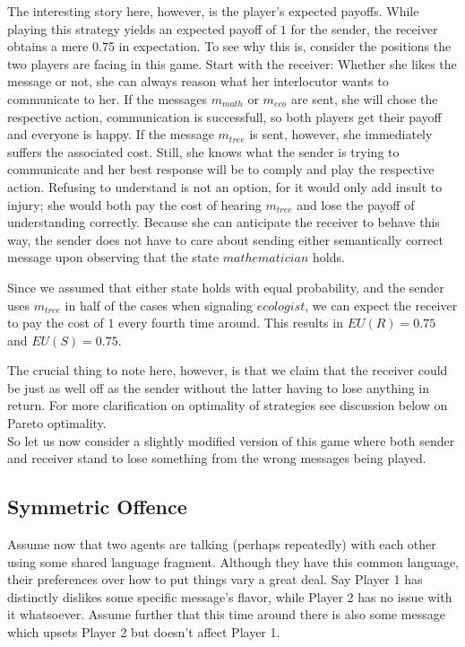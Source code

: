 \documentclass{article}
\begin{document}
The interesting story here, however, is the player's expected payoffs. While playing this strategy yields an expected payoff of $1$ for the sender, the receiver obtains a mere 0.75 in expectation. To see why this is, consider the positions the two players are facing in this game. Start with the receiver: Whether she likes the message or not, she can always reason what her interlocutor wants to communicate to her. If the messages $m_{math}$ or $m_{eco}$ are sent, she will chose the respective action, communication is successfull, so both players get their payoff and everyone is happy. If the message $m_{tree}$ is sent, however, she immediately suffers the associated cost. Still, she knows what the sender is trying to communicate and her best response will be to comply and play the respective action. Refusing to understand is not an option, for it would only add insult to injury; she would both pay the cost of hearing $m_{tree}$ and lose the payoff of understanding correctly. Because she can anticipate the receiver to behave this way, the sender does not have to care about sending either semantically correct message upon observing that the state $mathematician$ holds.

Since we assumed that either state holds with equal probability, and the sender uses $m_{tree}$ in half of the cases when signaling $ecologist$, we can expect the receiver to pay the cost of $1$ every fourth time around. This results in $EU(R)=0.75$ and $EU(S)=0.75$.

The crucial thing to note here, however, is that we claim that the receiver could be just as well off as the sender without the latter having to lose anything in return. For more clarification on optimality of strategies see discussion below on Pareto optimality. \\
So let us now consider a slightly modified version of this game where both sender and receiver stand to lose something from the wrong messages being played.
\subsection{Symmetric Offence}
Assume now that two agents are talking (perhaps repeatedly) with each other using some shared language fragment. Although they have this common language, their preferences over how to put things vary a great deal. Say Player 1 has distinctly dislikes some specific message's flavor, while Player 2 has no issue with it whatsoever. Assume further that this time around there is also some message which upsets Player 2 but doesn't affect Player 1.
\end{document}
